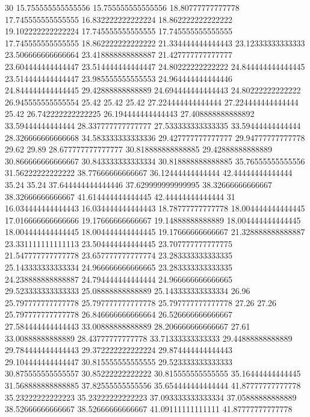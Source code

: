 30 15.755555555555556 15.755555555555556 18.80777777777778 17.745555555555555 16.832222222222224 18.862222222222222 19.102222222222224 17.745555555555555 17.745555555555555 17.745555555555555 18.862222222222222 21.334444444444443 23.12333333333333 23.506666666666664 23.418888888888887 21.427777777777777 23.604444444444447 23.514444444444447 24.80222222222222 24.844444444444445 23.514444444444447 23.985555555555553 24.964444444444446 24.844444444444445 29.42888888888889 24.694444444444443 24.80222222222222 26.945555555555554 25.42 25.42 25.42 27.224444444444444 27.224444444444444 25.42 26.742222222222225 26.194444444444443 27.408888888888892 33.59444444444444 28.337777777777777 27.533333333333335 33.59444444444444 28.326666666666668 34.583333333333336 29.427777777777777 29.94777777777778 29.62 29.89 28.677777777777777 30.818888888888885 29.42888888888889 30.866666666666667 30.843333333333334 30.818888888888885 35.76555555555556 31.56222222222222 38.77666666666667 36.12444444444444 42.44444444444444 35.24 35.24 37.644444444444446 37.629999999999995 38.32666666666667 38.32666666666667 41.614444444444445 42.44444444444444
31 16.034444444444443 16.034444444444443 18.78777777777778 18.004444444444445 17.016666666666666 19.17666666666667 19.14888888888889 18.004444444444445 18.004444444444445 18.004444444444445 19.17666666666667 21.328888888888887 23.331111111111113 23.504444444444445 23.707777777777775 21.547777777777778 23.657777777777774 23.283333333333335 25.143333333333334 24.966666666666665 23.283333333333335 24.238888888888887 24.794444444444444 24.966666666666665 29.523333333333333 25.08888888888889 25.143333333333334 26.96 25.797777777777778 25.797777777777778 25.797777777777778 27.26 27.26 25.797777777777778 26.846666666666664 26.526666666666667 27.584444444444443 33.00888888888889 28.206666666666667 27.61 33.00888888888889 28.43777777777778 33.71333333333333 29.44888888888889 29.784444444444443 29.372222222222224 29.874444444444443 29.104444444444447 30.815555555555555 29.523333333333333 30.875555555555557 30.85222222222222 30.815555555555555 35.16444444444445 31.568888888888885 37.82555555555556 35.654444444444444 41.87777777777778 35.23222222222223 35.23222222222223 37.093333333333334 37.05888888888889 38.52666666666667 38.52666666666667 41.09111111111111 41.87777777777778
